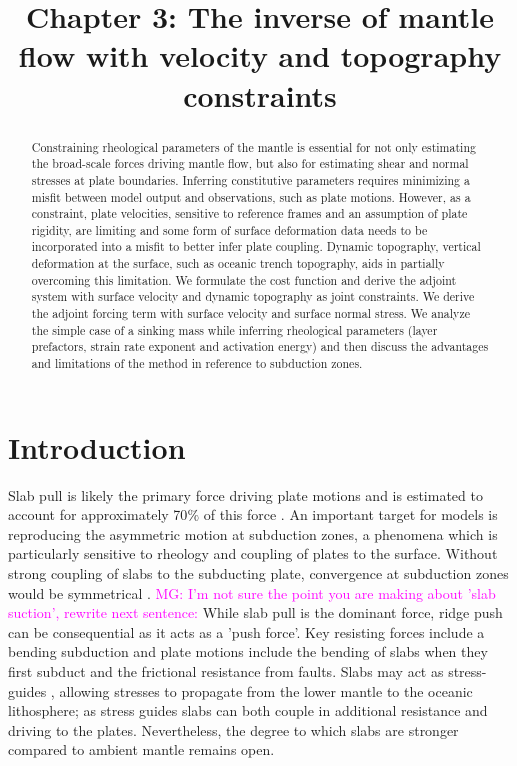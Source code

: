 \documentclass[12pt]{article}
\title{Chapter 3: The inverse of mantle flow with velocity and topography constraints}
\newcommand{\mgnote}[1]{\textcolor{magenta}{MG: #1}}
\begin{document}
\maketitle

\begin{abstract}
Constraining rheological parameters of the mantle is essential for not only estimating the broad-scale forces driving mantle flow, but also for estimating shear and normal stresses at plate boundaries. Inferring constitutive parameters requires minimizing a misfit between model output and observations, such as plate motions. However, as a constraint, plate velocities, sensitive to reference frames and an assumption of plate rigidity, are limiting and some form of surface deformation data needs to be incorporated into a misfit to better infer plate coupling. Dynamic topography, vertical deformation at the surface, such as oceanic trench topography, aids in partially overcoming this limitation. We formulate the cost function and derive the adjoint system with surface velocity and dynamic topography as joint constraints. We derive the adjoint forcing term with surface velocity and surface normal stress. We analyze the simple case of a sinking mass while inferring rheological parameters (layer prefactors, strain rate exponent and activation energy) and then discuss the advantages and limitations of the method in reference to subduction zones. 

\end{abstract}

\section*{Introduction}
  Slab pull is likely the primary force driving plate motions \citep{Forsyth01101975,JGR13769} and is estimated to account for approximately 70$\%$ of this force \citep{Conrad04102002}. An important target for models is reproducing the asymmetric motion at subduction zones, a phenomena which is particularly sensitive to rheology and coupling of plates to the surface. Without strong coupling of slabs to the subducting plate, convergence at subduction zones would be symmetrical \citep{Conrad04102002}. \mgnote{I'm not sure the point you are making about 'slab suction', rewrite next sentence:} While slab pull is the dominant force, ridge push can be consequential as it acts as a 'push force'. Key resisting forces include a bending subduction and plate motions include the bending of slabs when they first subduct and the frictional resistance from faults.  Slabs may act as stress-guides \citep{Stadler27082010}, allowing stresses to propagate from the lower mantle to the oceanic lithosphere; as stress guides slabs can both couple in additional resistance and driving to the plates. Nevertheless, the degree to which slabs are stronger compared to ambient mantle remains open. 
  
\end{document}
